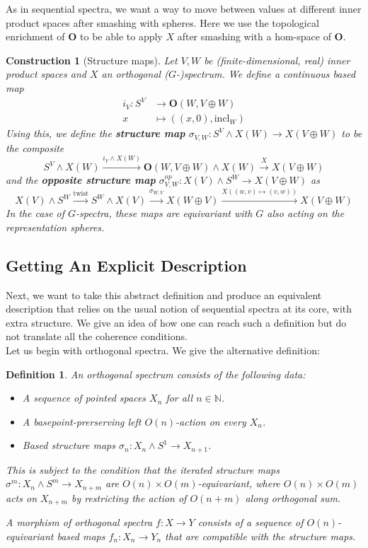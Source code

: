 \documentclass{scrartcl}
\newcommand{\textbi}[1]{\textbf{\textit{#1}}}
\newcommand{\bN}{\mathbb{N}}
\newcommand{\bfO}{\mathbf{O}}
\newtheorem{defin}[subsection]{Definition}
\newtheorem{cons}[subsection]{Construction}
\begin{document}
As in sequential spectra, we want a way to move between values at different inner product spaces after smashing with spheres. Here we use the topological enrichment of $\bfO$ to be able to apply $X$ after smashing with a hom-space of $\bfO$. 

\begin{cons}[Structure maps]
    Let $V,W$ be (finite-dimensional, real) inner product spaces and $X$ an orthogonal ($G$-)spectrum. We define a continuous based map 
    \begin{align*}
        i_V:S^V&\to \bfO(W, V\oplus W) \\
         x&\mapsto ((x,0), \text{incl}_W)
    \end{align*}
    Using this, we define the \textbi{structure map} $\sigma_{V,W}:S^V\wedge X(W)\to X(V\oplus W)$ to be the composite 
    $$S^V\wedge X(W)\xrightarrow{i_V\wedge X(W)} \bfO(W, V\oplus W)\wedge X(W)\xrightarrow{X} X(V\oplus W)$$
    and the \textbi{opposite structure map} $\sigma_{V,W}^{op}:X(V)\wedge S^W\to X(V\oplus W)$ as
    $$X(V)\wedge S^W\xrightarrow{\text{twist}}S^W\wedge X(V)\xrightarrow{\sigma_{W,V}}X(W\oplus V)\xrightarrow{X((w,v)\mapsto (v,w))}X(V\oplus W)$$
    In the case of $G$-spectra, these maps are equivariant with $G$ also acting on the representation spheres. 
\end{cons}

\subsection*{Getting An Explicit Description}

Next, we want to take this abstract definition and produce an equivalent description that relies on the usual notion of sequential spectra at its core, with extra structure. We give an idea of how one can reach such a definition but do not translate all the coherence conditions. \\ 

Let us begin with orthogonal spectra. We give the alternative definition:

\begin{defin}
    An orthogonal spectrum consists of the following data:
    \begin{itemize}
        \item A sequence of pointed spaces $X_n$ for all $n\in\bN$.
        \item A basepoint-prerserving left $O(n)$-action on every $X_n$.
        \item Based structure maps $\sigma_n:X_n\wedge S^1\to X_{n+1}$.
    \end{itemize}
    This is subject to the condition that the iterated structure maps $\sigma^m:X_n\wedge S^m\to X_{n+m}$ are $O(n)\times O(m)$-equivariant, where $O(n)\times O(m)$ acts on $X_{n+m}$ by restricting the action of $O(n+m)$ along orthogonal sum. \par
    A morphism of orthogonal spectra $f:X\to Y$ consists of a sequence of $O(n)$-equivariant based maps $f_n:X_n\to Y_n$ that are compatible with the structure maps.
\end{defin}
\end{document}
